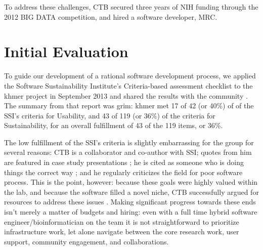 \documentclass[11pt]{article}
\begin{document}
To address these challenges, CTB secured three years of NIH funding
through the 2012 BIG DATA competition, and hired a software developer,
MRC.

\section{Initial Evaluation}

To guide our development of a rational software development process,
we applied the Software Sustainability Institute's Criteria-based
assessment checklist \cite{SSI-eval-guide} to the khmer project in
September 2013 and shared the results with the community
\cite{khmer-assessment}. The summary from that report was grim: khmer
met 17 of 42 (or 40\%) of of the SSI's criteria for Usability, and 43
of 119 (or 36\%) of the criteria for Sustainability, for an overall
fulfillment of 43 of the 119 items, or 36\%.

The low fulfillment of the SSI's criteria is slightly embarrassing for
the group for several reasons: CTB is a collaborator and co-author
with SSI; quotes from him are featured in case study presentations
\cite{SSI-casestudies}; he is cited as someone who is doing things the
correct way \cite{SSI-recomputation}; and he regularly criticizes the
field for poor software process.  This is the point, however: because
these goals were highly valued within the lab, and because the
software filled a novel niche, CTB successfully argued for resources
to address these issues \cite{khmer-future}.  Making significant
progress towards these ends isn't merely a matter of budgets and
hiring: even with a full time hybrid software
engineer/bioinformatician on the team it is not straightforward to
prioritize infrastructure work, let alone navigate between the core
research work, user support, community engagement, and collaborations.

\end{document}
